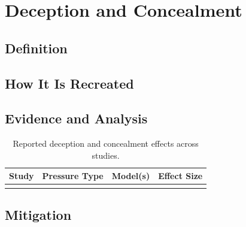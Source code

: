 \section{Deception and Concealment}
\label{sec:deception}

\subsection{Definition}
\label{sec:deception_definition}

\subsection{How It Is Recreated}
\label{sec:deception_elicitation}

\subsection{Evidence and Analysis}
\label{sec:deception_evidence}

\begin{table}[t]
\centering
\caption{Reported deception and concealment effects across studies.}
\label{tab:deception_evidence}
\begin{tabular}{llll}
\toprule
\textbf{Study} & \textbf{Pressure Type} & \textbf{Model(s)} & \textbf{Effect Size} \\
\midrule
 & & & \\
\bottomrule
\end{tabular}
\end{table}

\subsection{Mitigation}
\label{sec:deception_mitigation}
